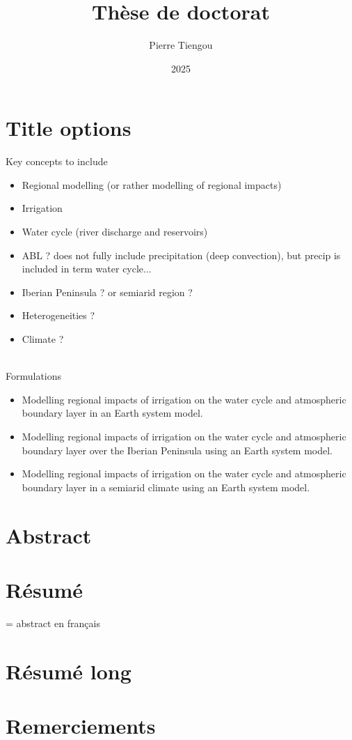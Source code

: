 \documentclass{report}
\begin{document}
\section*{Title options}
    Key concepts to include
    \begin{itemize}
        \item Regional modelling (or rather modelling of regional impacts)
        \item Irrigation
        \item Water cycle (river discharge and reservoirs)
        \item ABL ? does not fully include precipitation (deep convection), but precip is included in term water cycle...
        \item Iberian Peninsula ? or semiarid region ? 
        \item Heterogeneities ?
        \item Climate ?
    \end{itemize}
    \hfill
    \\
    Formulations
    \begin{itemize}
        \item Modelling regional impacts of irrigation on the water cycle and atmospheric boundary layer in an Earth system model.
        \item Modelling regional impacts of irrigation on the water cycle and atmospheric boundary layer over the Iberian Peninsula using an Earth system model.
        \item Modelling regional impacts of irrigation on the water cycle and atmospheric boundary layer in a semiarid climate using an Earth system model.
    \end{itemize}


\title{Thèse de doctorat}
\author{Pierre Tiengou }
\date{2025}
\maketitle

\section*{Abstract}
\section*{Résumé}
= abstract en français
\section*{Résumé long}
\section*{Remerciements}

\clearpage
\dominitoc
\renewcommand*\contentsname{Contents}
\tableofcontents
\newpage








\newpage

\printbibliography

\listoffigures
\newpage
\listoftables
\end{document}
